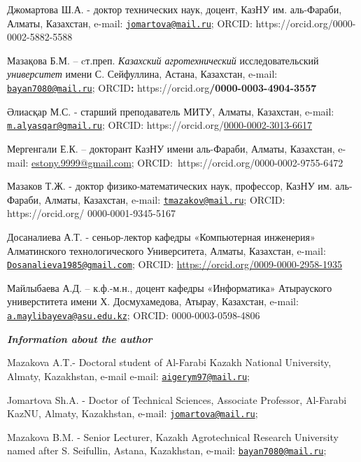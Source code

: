 \documentclass[
]{article}
\begin{document}
Джомартова Ш.А. - доктор технических наук, доцент, КазНУ им. аль-Фараби,
Алматы, Казахстан, e-mail:
\href{mailto:jomartova@mail.ru}{\nolinkurl{jomartova@mail.ru}}; ORCID:
https://orcid.org/0000-0002-5882-5588

Мазақова Б.М. -- cт.преп. \emph{Казахский агротехнический}
исследовательский \emph{университет} имени С. Сейфуллина, Астана,
Казахстан, e-mail:
\href{mailto:bayan7080@mail.ru}{\nolinkurl{bayan7080@mail.ru}};
ORCID\textbf{:} https://orcid.org\textbf{/0000-0003-4904-3557}

Әлиасқар М.С. - старший преподаватель МИТУ, Алматы, Казахстан, e-mail:
\href{mailto:m.alyasqar@gmail.ru}{\nolinkurl{m.alyasqar@gmail.ru}};
ORCID:
https://orcid.org/\href{https://orcid.org/0000-0002-3013-6617}{0000-0002-3013-6617}

Мергенгали Е.К. -- докторант КазНУ имени аль-Фараби, Алматы, Казахстан,
e-mail:
\href{https://e.mail.ru/compose/?mailto=mailto\%3aestony.9999@gmail.com}{estony.9999@gmail.com};
ORCID:~https://orcid.org/0000-0002-9755-6472

Мазаков Т.Ж. - доктор физико-математических наук, профессор, КазНУ им.
аль-Фараби, Алматы, Казахстан, e-mail:
\href{mailto:tmazakov@mail.ru}{\nolinkurl{tmazakov@mail.ru}}; ORCID:
https://orcid.org/ 0000-0001-9345-5167

Досаналиева А.Т. - сеньор-лектор кафедры «Компьютерная инженерия»
Алматинского технологического Университета, Алматы, Казахстан, e-mail:
\href{mailto:Dosanalieva1985@gmail.com}{\nolinkurl{Dosanalieva1985@gmail.com}};
ORCID: \url{https://orcid.org/0009-0000-2958-1935}

Майлыбаева А.Д. -- к.ф.-м.н., доцент кафедры «Информатика» Атырауского
универститета имени Х. Досмухамедова, Атырау, Казахстан, e-mail:
\href{mailto:a.maylibayeva@asu.edu.kz}{\nolinkurl{a.maylibayeva@asu.edu.kz}};
ORCID: 0000-0003-0598-4806

\emph{\textbf{Information about the author}}

Mazakova A.T.- Doctoral student of Al-Farabi Kazakh National University,
Almaty, Kazakhstan, e-mail e-mail:
\href{mailto:aigerym97@mail.ru}{\nolinkurl{aigerym97@mail.ru}};

Jomartova Sh.A. - Doctor of Technical Sciences, Associate Professor,
Al-Farabi KazNU, Almaty, Kazakhstan, e-mail:
\href{mailto:jomartova@mail.ru}{\nolinkurl{jomartova@mail.ru}};

Mazakova B.M. - Senior Lecturer, Kazakh Agrotechnical Research
University named after S. Seifullin, Astana, Kazakhstan, e-mail:
\href{mailto:bayan7080@mail.ru}{\nolinkurl{bayan7080@mail.ru}};
\end{document}
